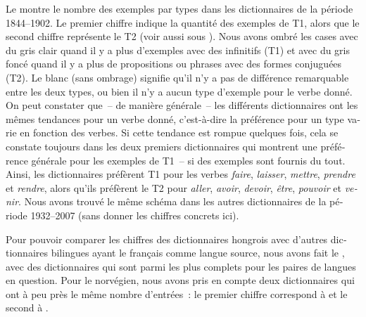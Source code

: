 \documentclass[output=paper,colorlinks,citecolor=brown,arabicfont,chinesefont,booklanguage=french]{langscibook}
\begin{document}
\begin{otherlanguage}{french}
Le  montre le nombre des exemples par types dans les dictionnaires de la période 1844–1902. Le premier chiffre indique la quantité des exemples de T1, alors que le second chiffre représente le T2 (voir aussi  sous ). Nous avons ombré les cases avec du gris clair quand il y a plus d’exemples avec des infinitifs (T1) et avec du gris foncé quand il y a plus de propositions ou phrases avec des formes conjuguées (T2). Le blanc (sans ombrage) signifie qu’il n’y a pas de différence remarquable entre les deux types, ou bien il n’y a aucun type d’exemple pour le verbe donné. On peut constater que~-- de manière générale~-- les différents dictionnaires ont les mêmes tendances pour un verbe donné, c’est-à-dire la préférence pour un type varie en fonction des verbes. Si cette tendance est rompue quelques fois, cela se constate toujours dans les deux premiers dictionnaires qui montrent une préférence générale pour les exemples de T1~-- si des exemples sont fournis du tout. Ainsi, les dictionnaires préfèrent T1 pour les verbes \emph{faire}, \emph{laisser}, \emph{mettre}, \emph{prendre} et \emph{rendre}, alors qu’ils préfèrent le T2 pour \emph{aller}, \emph{avoir}, \emph{devoir}, \emph{être}, \emph{pouvoir} et \emph{venir}. Nous avons trouvé le même schéma dans les autres dictionnaires de la période 1932–2007 (sans donner les chiffres concrets ici).

Pour pouvoir comparer les chiffres des dictionnaires hongrois avec d’autres dictionnaires bilingues ayant le français comme langue source, nous avons fait le , avec des dictionnaires qui sont parmi les plus complets pour les paires de langues en question. Pour le norvégien, nous avons pris en compte deux dictionnaires qui ont à peu près le même nombre d’entrées~: le premier chiffre correspond à \citealt{Elligers1995} et le second à \citealt{Jacobsen2014}.


\end{otherlanguage}
\end{document}
